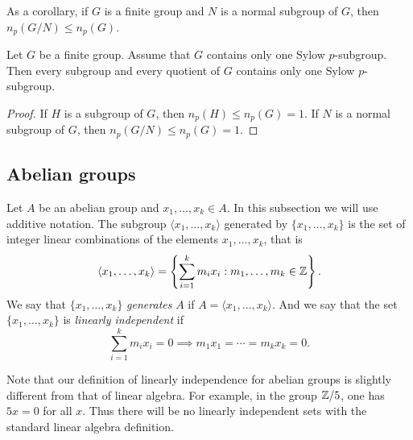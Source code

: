 As a corollary, if $G$ is a finite group and
$N$ is a normal subgroup of $G$, then 
$n_p(G/N)\leq n_p(G)$.

\begin{corollary}
Let $G$ be a finite group. Assume that 
$G$ contains only one Sylow $p$-subgroup. Then
every subgroup and every quotient of 
$G$ 
contains only one Sylow 
$p$-subgroup. 
\end{corollary}

\begin{proof}
    If $H$ is a subgroup of $G$, then
    $n_p(H)\leq n_p(G)=1$. If $N$ is a normal subgroup of 
    $G$, then $n_p(G/N)\leq n_p(G)=1$.
\end{proof}

%
%

\subsection{Abelian groups}

Let $A$ be an abelian group and $x_1,\dots,x_k\in A$. In this subsection we will use additive notation.  
The subgroup $\langle x_1,\dots,x_k\rangle$ 
generated by $\{x_1,\dots,x_k\}$
is the set of integer linear combinations of the elements 
$x_1,\dots,x_k$, that is
\[ 
\langle x_1,\dots,x_k\rangle=\left\{ 
\sum_{i=1}^k m_ix_i: m_1,\dots,m_k\in\mathbb{Z}\right\}.
\]
We say that $\{x_1,\dots,x_k\}$ \emph{generates} $A$ if 
$A=\langle x_1,\dots,x_k\rangle$. And we say that the set 
$\{x_1,\dots,x_k\}$ is 
\emph{linearly independent} if 
\[
\sum_{i=1}^k m_ix_i=0\implies m_1x_1=\cdots=m_kx_k=0.
\]

Note that our definition of linearly independence for abelian groups is slightly 
different from that of linear algebra. For example, in the group $\mathbb{Z}/5$, 
one has $5x=0$ for all $x$. Thus there will be no linearly independent sets with 
the standard linear algebra definition. 

